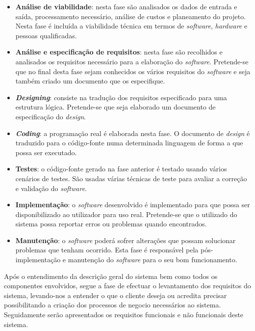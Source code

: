\begin{itemize}
	\item \textbf{Análise de viabilidade}: nesta fase são analisados os dados de entrada e saída, processamento necessário, análise de custos e planeamento do projeto. Nesta fase é incluída a viabilidade técnica em termos de \textit{software}, \textit{hardware} e pessoas qualificadas. 
	
	\item \textbf{Análise e especificação de requisitos}: nesta fase são recolhidos e analisados os requisitos necessário para a elaboração do \textit{software}. Pretende-se que no final desta fase sejam conhecidos os vários requisitos do \textit{software} e seja também criado um documento que os especifique. 
	
	\item  \textbf{\textit{Designing}}: consiste na tradução dos requisitos especificado para uma estrutura lógica. Pretende-se que seja elaborado um documento de especificação do \textit{design}. 
	
	
	\item  \textbf{\textit{Coding}}: a programação real é elaborada nesta fase. O documento de \textit{design} é traduzido para o código-fonte numa determinada linguagem de forma a que possa ser executado. 
	
	\item \textbf{Testes}: o código-fonte gerado na fase anterior é testado usando vários cenários de testes. São usadas várias técnicas de teste para avaliar a correção e validação do \textit{software}. 
	
	\item  \textbf{Implementação}: o \textit{software} desenvolvido é implementado para que possa ser disponibilizado ao utilizador para uso real. Pretende-se que o utilizado do sistema possa reportar erros ou problemas quando encontrados. 
	
	\item  \textbf{Manutenção}: o \textit{software} poderá sofrer alterações que possam solucionar problemas que tenham ocorrido. Esta fase é responsável pela pós-implementação e manutenção do \textit{software} para o seu bom funcionamento.
	
\end{itemize}


Após o entendimento da descrição geral do sistema bem como todos os componentes envolvidos, segue a fase de efectuar o levantamento dos requisitos do sistema, levando-nos a entender o que o cliente deseja ou acredita precisar possibilitando a criação dos processos de negocio necessários ao sistema. Seguidamente serão apresentados os requisitos funcionais e não funcionais deste sistema. 



